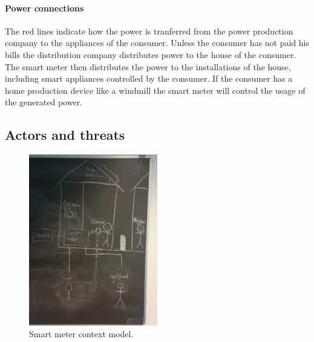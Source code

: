 \paragraph{Power connections}
The red lines indicate how the power is tranferred from the power production company to the appliances of the consumer.
Unless the consumer has not paid his bills the distribution company distributes power to the house of the consumer.
The smart meter then distributes the power to the installations of the house, including smart appliances controlled by the consumer.
If the consumer has a home production device like a windmill the smart meter will control the usage of the generated power.

\subsection{Actors and threats}
\begin{figure}
  \centering
  \includegraphics[width=0.5\textwidth]{figures/situation}
  \caption{Smart meter context model.}
  \label{contextual:sm_model}
\end{figure}

